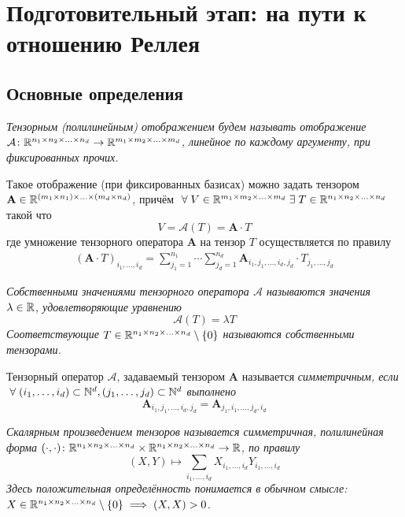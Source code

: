 \documentclass[12pt]{article}
\newcommand{\mbf}{\mathbf}
\newcommand{\A}{\; \forall \;}
\newcommand{\E}{\; \exists \;}
\begin{document}
    \section*{Подготовительный этап: на пути к отношению Реллея}
    \subsection*{Основные определения}
    \begin{definition}
        \it{Тензорным (полилинейным) отображением} будем называть отображение\\ $\mathcal{A} \colon\mathbb{R}^{n_1 \times n_2 \times \ldots \times n_d} \to \mathbb{R}^{m_1 \times m_2 \times \ldots \times m_d}$,
        линейное по каждому аргументу, при фиксированных прочих.
    \end{definition}
    Такое отображение (при фиксированных базисах) можно задать тензором $\mbf{A} \in \RR^{(m_1 \times n_1) \times \ldots \times (m_d \times n_d)}$,
    причём $\A V \in \RR^{m_1 \times m_2 \times \ldots \times m_d} \E T \in \RR^{n_1 \times n_2 \times \ldots \times n_d}$ такой что
    \[
        V = \mathcal{A}(T) = \mbf{A} \cdot T
    \]
    где умножение тензорного оператора $\mbf{A}$ на тензор $T$ осуществляется по правилу
    \begin{align}
    (\mbf{A} \cdot T)
        _{i_1, \ldots, i_d} = \sum_{j_1 = 1}^{n_1}\cdots\sum_{j_d = 1}^{n_d} \mbf{A}_{i_1, j_1, \ldots, i_d, j_d} \cdot T_{j_1, \ldots, j_d}
    \end{align}

    \begin{definition}
        \it{Собственными значениями} тензорного оператора $\mathcal{A}$ называются значения $\lambda \in \mathbb{R}$, удовлетворяющие уравнению
        \[
            \mathcal{A}(T) = \lambda T
        \]
        Соответствующие $T \in \mathbb{R}^{n_1 \times n_2 \times \ldots \times n_d} \setminus \{0\}$ называются \it{собственными тензорами}.
    \end{definition}
    \begin{definition}
        Тензорный оператор $\mathcal{A}$, задаваемый тензором $\mbf{A}$ называется \it{симметричным}, если
        $\A (i_1, \ldots, i_d) \subset \NN^{d}, (j_1, \ldots, j_d) \subset \NN^{d}$
        выполнено
        \[
            \mbf{A}_{i_1, j_1, \ldots, i_d, j_d} = \mbf{A}_{j_1, i_1, \ldots, j_d, i_d}
        \]
    \end{definition}
    \begin{definition}
        \it{Скалярным произведением тензоров} называется симметричная, полилинейная форма
        $(\cdot, \cdot)\colon \mathbb{R}^{n_1 \times n_2 \times \ldots \times n_d} \times \mathbb{R}^{n_1 \times n_2 \times \ldots \times n_d} \to \mathbb{R}$,
        по правилу
        \[
            (X, Y) \mapsto \sum_{i_1, \ldots, i_d} X_{i_1, \ldots, i_d} Y_{i_1, \ldots, i_d}
        \]
        Здесь положительная определённость понимается в обычном смысле: $X \in \mathbb{R}^{n_1 \times n_2 \times \ldots \times n_d}\setminus \{0\} \implies (X, X) > 0$.
    \end{definition}
\end{document}
